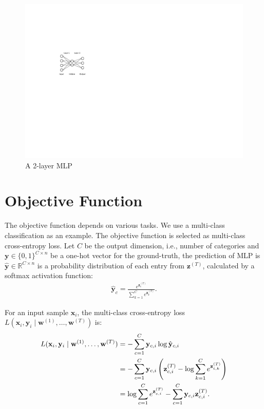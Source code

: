 \documentclass{article}
\begin{document}
\begin{figure}[!ht]
    \centering
    \includegraphics{figs/mlp}
    \caption{A 2-layer MLP}
    \label{fig:mlp}
\end{figure}

\section{Objective Function}
The objective function depends on various tasks. We use a multi-class classification as an example. The objective function is selected as multi-class cross-entropy loss. Let $C$ be the output dimension, i.e., number of categories and $\mathbf{y} \in \{0, 1\}^{C \times n}$ be a one-hot vector for the ground-truth, the prediction of MLP is $\hat{\mathbf{y}} \in \mathbb{R}^{C \times n}$ is a probability distribution of each entry from $\mathbf{z}^{(T)}$, calculated by a softmax activation function:
\begin{align}
    \hat{\mathbf{y}}_c = \frac{e^{\mathbf{z}^{(T)}_c}}{\sum_{k = 1}^{C}{e^{\mathbf{z}^{(T)}_k}}}. \label{eq:softmax}
\end{align}

For an input sample $\mathbf{x}_i$, the multi-class cross-entropy loss $L(\mathbf{x}_i, \mathbf{y}_i \mid \mathbf{w}^{(1)}, \dots, \mathbf{w}^{(T)})$ is:
\begin{align}
    L(\mathbf{x}_i, \mathbf{y}_i \mid \mathbf{w}^{(1)}, \dots, \mathbf{w}^{(T)}) &= -\sum_{c = 1}^{C}{\mathbf{y}_{c, i}\log{\hat{\mathbf{y}}_{c, i}}} \\
    &= -\sum_{c = 1}^{C}{\mathbf{y}_{c, i}\left(\mathbf{z}^{(T)}_{c, i} - \log{\sum_{k = 1}^{C}{e^{\mathbf{z}^{(T)}_{i, k}}}}\right)} \notag \\
    &= \log{\sum_{c = 1}^{C}{e^{\mathbf{z}^{(T)}_{c, i}}}} - \sum_{c = 1}^{C}{\mathbf{y}_{c, i}\mathbf{z}^{(T)}_{c, i}}. \label{eq:logsumexp}
\end{align}
\end{document}
